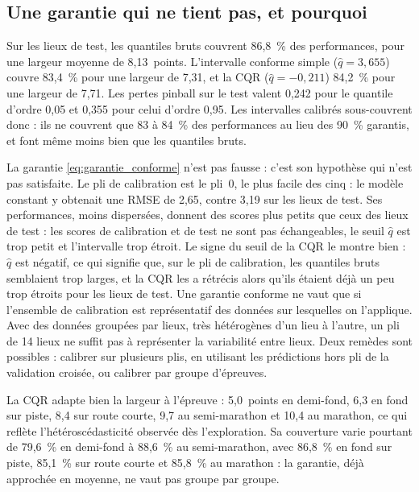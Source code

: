 \documentclass[11pt,a4paper]{article}
\begin{document}
\subsection{Une garantie qui ne tient pas, et pourquoi}\label{sec:sous_couverture}

Sur les lieux de test, les quantiles bruts couvrent 86,8~\% des performances, pour une largeur moyenne de
8,13~points. L'intervalle conforme simple ($\hat q = 3{,}655$) couvre 83,4~\% pour une largeur de 7,31, et la CQR
($\hat q = -0{,}211$) 84,2~\% pour une largeur de 7,71. Les pertes pinball sur le test valent 0,242 pour le quantile
d'ordre 0,05 et 0,355 pour celui d'ordre 0,95. Les intervalles calibrés sous-couvrent donc : ils ne couvrent que 83 à
84~\% des performances au lieu des 90~\% garantis, et font même moins bien que les quantiles bruts.

La garantie \eqref{eq:garantie_conforme} n'est pas fausse : c'est son hypothèse qui n'est pas satisfaite. Le pli de
calibration est le pli~0, le plus facile des cinq : le modèle constant y obtenait une RMSE de 2,65, contre 3,19 sur les
lieux de test. Ses performances, moins dispersées, donnent des scores plus petits que ceux des lieux de test : les
scores de calibration et de test ne sont pas échangeables, le seuil $\hat q$ est trop petit et l'intervalle trop
étroit. Le signe du seuil de la CQR le montre bien : $\hat q$ est négatif, ce qui signifie que, sur le pli de
calibration, les quantiles bruts semblaient trop larges, et la CQR les a rétrécis alors qu'ils étaient déjà un peu
trop étroits pour les lieux de test. Une garantie conforme ne vaut que si l'ensemble de calibration est représentatif
des données sur lesquelles on l'applique. Avec des données groupées par lieux, très hétérogènes d'un lieu à l'autre,
un pli de 14 lieux ne suffit pas à représenter la variabilité entre lieux. Deux remèdes sont possibles : calibrer sur
plusieurs plis, en utilisant les prédictions hors pli de la validation croisée, ou calibrer par groupe d'épreuves.

La CQR adapte bien la largeur à l'épreuve : 5,0~points en demi-fond, 6,3 en fond sur piste, 8,4 sur route courte, 9,7
au semi-marathon et 10,4 au marathon, ce qui reflète l'hétéroscédasticité observée dès l'exploration. Sa couverture
varie pourtant de 79,6~\% en demi-fond à 88,6~\% au semi-marathon, avec 86,8~\% en fond sur piste, 85,1~\% sur route
courte et 85,8~\% au marathon : la garantie, déjà approchée en moyenne, ne vaut pas groupe par groupe.
\end{document}
